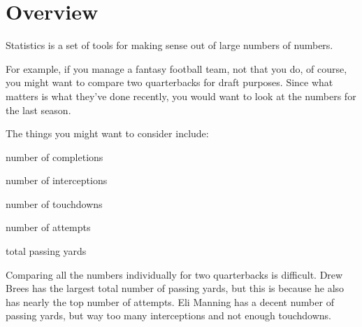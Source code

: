 \documentclass[fleqn, onecolumn]{article}
\begin{document}
  \section{Overview}
  Statistics is a set of tools for making sense out of large numbers of numbers.  

  For example, if you manage a fantasy football team, not that you do, of course, you might want to compare two
  quarterbacks for draft purposes.  Since what matters is what they've done recently, you would want to look at the
  numbers for the last season.

  The things you might want to consider include:
  \begin{itemize*}
    \item number of completions
    \item number of interceptions
    \item number of touchdowns
    \item number of attempts
    \item total passing yards
  \end{itemize*}

  Comparing all the numbers individually for two quarterbacks is difficult.  Drew Brees has the largest total number of
  passing yards, but this is because he also has nearly the top number of attempts.  Eli Manning has a decent number of
  passing yards, but way too many interceptions and not enough touchdowns.
\end{document}
